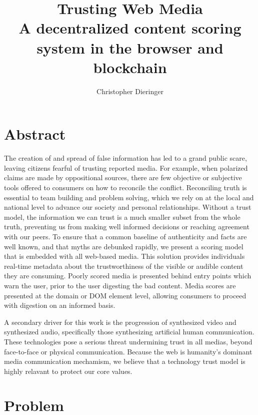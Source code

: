 \documentclass{paper}
\begin{document}
\title{%
Trusting Web Media \\
\large A decentralized content scoring system in the browser and blockchain}

\author{Christopher Dieringer}

\maketitle
\newpage

\section{Abstract}
The creation of and spread of false information has led to
a grand public scare, leaving citizens fearful of trusting
reported media.  For example, when polarized claims are made by oppositional
sources, there are few objective or subjective tools offered to consumers
on how to reconcile the conflict.  Reconciling truth is essential to
team building and problem solving, which we rely on at the local and national
level to advance our society and personal relationships.  Without a trust model, the
information we can trust is a much smaller subset from the whole truth,
preventing us from making well informed decisions or reaching agreement with
our peers.  To ensure that a common baseline of authenticity and facts are well known,
and that myths are debunked rapidly, we present a scoring model that is embedded with
all web-based media.  This solution provides individuals real-time metadata about the
trustworthiness of the visible or audible content they are consuming.  Poorly scored media is
presented behind entry points which warn the user, prior to the user digesting the bad content.
Media scores are presented at the domain or DOM element level,
allowing consumers to proceed with digestion on an informed basis.

A secondary driver for this work is the progression of synthesized video and
synthesized audio, specifically those synthesizing artificial human communication.
These technologies pose a
serious threat undermining trust in all medias, beyond face-to-face or physical
communication.  Because the web is humanity's dominant media communication
mechamism, we believe that a technology trust model is highly relavant
to protect our core values.

\section{Problem}
\end{document}
